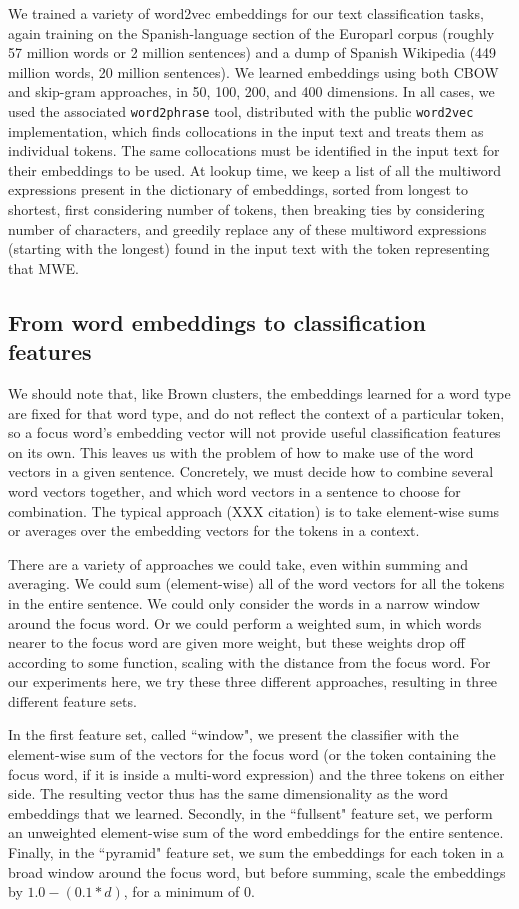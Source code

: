 We trained a variety of word2vec embeddings for our text classification tasks,
again training on the Spanish-language section of the Europarl corpus (roughly
57 million words or 2 million sentences) and a dump of Spanish Wikipedia (449
million words, 20 million sentences). We learned embeddings using both CBOW and
skip-gram approaches, in 50, 100, 200, and 400 dimensions. In all cases, we
used the associated \texttt{word2phrase} tool, distributed with the public
\texttt{word2vec} implementation, which finds collocations in the input text
and treats them as individual tokens. The same collocations must be identified
in the input text for their embeddings to be used. At lookup time, we keep a
list of all the multiword expressions present in the dictionary of embeddings,
sorted from longest to shortest, first considering number of tokens, then
breaking ties by considering number of characters, and greedily replace any of
these multiword expressions (starting with the longest) found in the input text
with the token representing that MWE.

\subsection{From word embeddings to classification features}
We should note that, like Brown clusters, the embeddings learned for a word
type are fixed for that word type, and do not reflect the context of a
particular token, so a focus word's embedding vector will not provide useful
classification features on its own. This leaves us with the problem of how to
make use of the word vectors in a given sentence. Concretely, we must decide
how to combine several word vectors together, and which word vectors in a
sentence to choose for combination. The typical approach (XXX citation) is to
take element-wise sums or averages over the embedding vectors for the tokens in
a context.

There are a variety of approaches we could take, even within summing and
averaging. We could sum (element-wise) all of the word vectors for all the
tokens in the entire sentence. We could only consider the words in a narrow
window around the focus word. Or we could perform a weighted sum, in which
words nearer to the focus word are given more weight, but these weights drop
off according to some function, scaling with the distance from the focus word.
For our experiments here, we try these three different approaches, resulting in
three different feature sets.

In the first feature set, called ``window", we present the classifier with the
element-wise sum of the vectors for the focus word (or the token containing the
focus word, if it is inside a multi-word expression) and the three tokens on
either side. The resulting vector thus has the same dimensionality as the word
embeddings that we learned. Secondly, in the ``fullsent" feature set, we
perform an unweighted element-wise sum of the word embeddings for the entire
sentence. Finally, in the ``pyramid" feature set, we sum the embeddings for
each token in a broad window around the focus word, but before summing, scale
the embeddings by $1.0 - (0.1 * d) $, for a minimum of 0.


